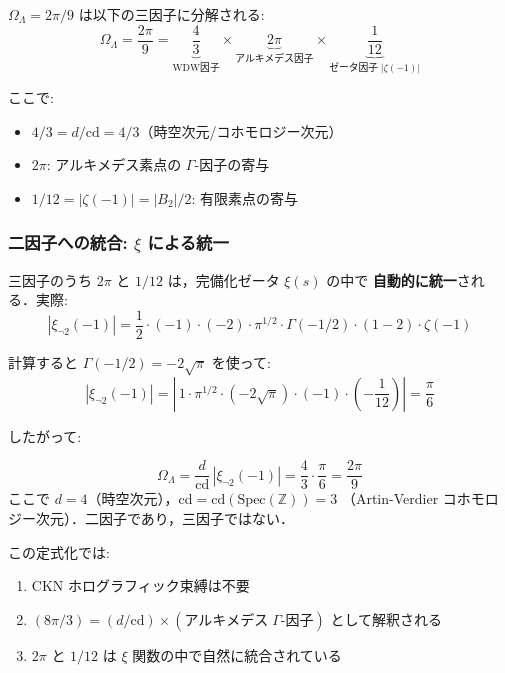 \documentclass[11pt,a4paper]{article}
\begin{document}
$\Omega_\Lambda = 2\pi/9$ は以下の三因子に分解される:
\begin{equation}
\boxed{
\Omega_\Lambda = \frac{2\pi}{9} = \underbrace{\frac{4}{3}}_{\text{WDW因子}}
\times \underbrace{2\pi}_{\text{アルキメデス因子}}
\times \underbrace{\frac{1}{12}}_{\text{ゼータ因子}\;|\zeta(-1)|}
}
\end{equation}

ここで:
\begin{itemize}
\item $4/3 = d/\mathrm{cd} = 4/3$（時空次元/コホモロジー次元）
\item $2\pi$: アルキメデス素点の $\Gamma$-因子の寄与
\item $1/12 = |\zeta(-1)| = |B_2|/2$: 有限素点の寄与
\end{itemize}

\subsubsection{二因子への統合: $\xi$ による統一}

三因子のうち $2\pi$ と $1/12$ は，完備化ゼータ $\xi(s)$ の中で
\textbf{自動的に統一}される．実際:
\begin{equation}
|\xi_{\neg 2}(-1)| = \frac{1}{2}\cdot(-1)\cdot(-2)\cdot\pi^{1/2}\cdot\Gamma(-1/2)
\cdot(1-2)\cdot\zeta(-1)
\end{equation}

計算すると $\Gamma(-1/2) = -2\sqrt{\pi}$ を使って:
\begin{equation}
|\xi_{\neg 2}(-1)| = \left|\,1\cdot\pi^{1/2}\cdot(-2\sqrt{\pi})\cdot(-1)\cdot\left(-\frac{1}{12}\right)\right|
= \frac{\pi}{6}
\end{equation}

したがって:
\begin{keyresult}
\begin{equation}
\Omega_\Lambda = \frac{d}{\mathrm{cd}}\,|\xi_{\neg 2}(-1)|
= \frac{4}{3}\cdot\frac{\pi}{6}
= \frac{2\pi}{9}
\end{equation}
ここで $d = 4$（時空次元），$\mathrm{cd} = \mathrm{cd}(\mathrm{Spec}(\mathbb{Z})) = 3$
（Artin-Verdier コホモロジー次元）．二因子であり，三因子ではない．
\end{keyresult}

この定式化では:
\begin{enumerate}
\item CKN ホログラフィック束縛は不要
\item $(8\pi/3) = (d/\mathrm{cd}) \times (\text{アルキメデス}\;\Gamma\text{-因子})$ として解釈される
\item $2\pi$ と $1/12$ は $\xi$ 関数の中で自然に統合されている
\end{enumerate}
\end{document}
